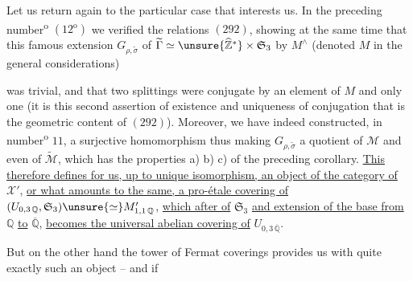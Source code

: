 Let us return again to the particular case that interests us. In the preceding number\textsuperscript{o} $(12^{\mathrm o})$ we verified the  relations $(292)$, showing at the same time that this famous extension $G_{\rho,\widetilde\sigma}$ of $\widetilde\Gamma\simeq\unsure{\widehat{\mathbb Z}^{*}}\times\mathfrak S_3$ by $M^{\wedge}$ (denoted $M$ in the general considerations)




was trivial, and that two splittings were conjugate by an element of $M$ and only one (it is this second assertion of existence and uniqueness of conjugation that is the geometric content of $(292)$).
Moreover, we have  indeed constructed, in number\textsuperscript{o} $11$, a surjective homomorphism
thus making $G_{\rho,\widetilde\sigma}$ a quotient of $\mathcal M$ and even of $\widetilde{\mathcal M}$, which has the properties a) b) c) of the preceding corollary. \uline{This therefore defines for us, up to unique isomorphism, an object of the category of} $\mathcal X'$,
\uline{or what amounts to the same, a pro-étale covering of} $(U_{0,3\,\mathbb Q},\mathfrak S_3)\unsure{\simeq}M'_{1,1\,\mathbb Q}$,
\uline{which after   of} $\mathfrak S_3$ \uline{and extension of the base from} $\mathbb Q$ \uline{to} $\overline{\mathbb Q}$, \uline{becomes the universal abelian covering of} $U_{0,3\,\overline{\mathbb Q}}$.

But on the other hand the tower of Fermat coverings provides us with quite exactly such an object -- and if




